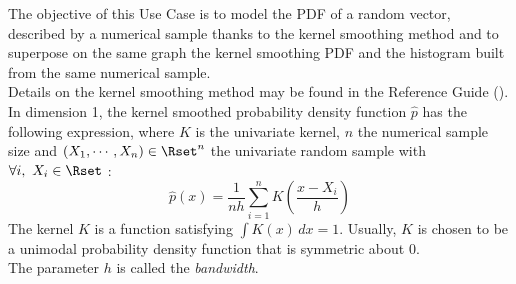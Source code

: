 \renewcommand{\filename}{docUC_InputWithData_KernelSmoothing.tex}
\renewcommand{\filetitle}{UC : PDF fitting by kernel smoothing and graphical validation : superposition of the empirical and kernel smoothing CDF}

\HeaderIIILevel



The objective of this Use Case is to model the PDF of a random  vector, described by a numerical sample thanks to the kernel smoothing method and to superpose on the same graph the kernel smoothing PDF and the histogram built from the same numerical sample.\\



Details on the kernel smoothing method may be found in the Reference Guide ().\\


In dimension 1, the kernel smoothed probability density function $\hat{p}$ has the following expression, where $K$ is the univariate kernel, $n$ the numerical sample size and $(X_1, \cdots, X_n) \in \Rset^n$ the univariate random sample with $\forall i, \, \, X_i \in \Rset$ :
\begin{equation}
  \label{kernelSmooth}
  \hat{p}(x) = \displaystyle \frac{1}{nh}\sum_{i=1}^{n} K\left(\frac{x-X_i}{h}\right)
\end{equation}
The kernel $K$ is a function satisfying $\int K(x)\, dx=1$. Usually, $K$ is chosen to be a unimodal probability density function that is symmetric about 0.\\
The parameter $h$ is called the \emph{bandwidth}.\\

